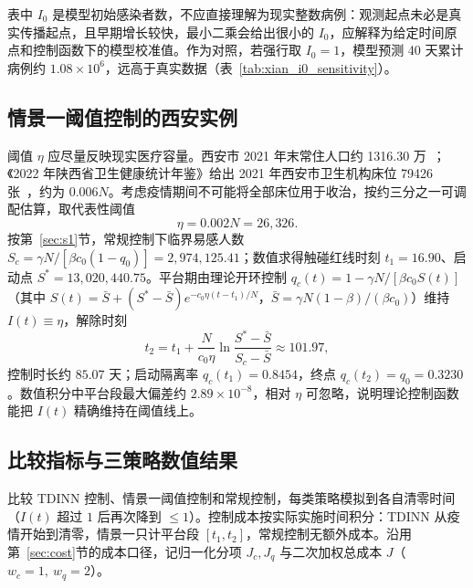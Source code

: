 \documentclass[lang=cn,a4paper,newtx]{elegantpaper}
\numberwithin{equation}{section}
\theoremstyle{plain}
\begin{document}
表中 $I_0$ 是模型初始感染者数，不应直接理解为现实整数病例：观测起点未必是真实传播起点，且早期增长较快，最小二乘会给出很小的 $I_0$，应解释为给定时间原点和控制函数下的模型校准值。作为对照，若强行取 $I_0=1$，模型预测 40 天累计病例约 $1.08\times10^6$，远高于真实数据（表~\ref{tab:xian_i0_sensitivity}）。

\begin{table}[htbp]
    \centering
    \caption{固定参数后的初始条件估计。}
    \label{tab:xian_initial_fit}
    
\end{table}

\begin{table}[htbp]
    \centering
    \caption{$I_0=1$ 对照设定下的初值敏感性说明。}
    \label{tab:xian_i0_sensitivity}
    {}
\end{table}

\subsection{情景一阈值控制的西安实例}
阈值 $\eta$ 应尽量反映现实医疗容量。西安市 2021 年末常住人口约 1316.30 万~\cite{XianStat2021}；《2022 年陕西省卫生健康统计年鉴》给出 2021 年西安市卫生机构床位 79426 张~\cite{ShaanxiHealth2022}，约为 $0.006N$。考虑疫情期间不可能将全部床位用于收治，按约三分之一可调配估算，取代表性阈值
\begin{equation}
\eta=0.002N=26{,}326.
\end{equation}
按第~\ref{sec:s1}节，常规控制下临界易感人数 $S_c=\gamma N/[\beta c_0(1-q_0)]=2{,}974{,}125.41$；数值求得触碰红线时刻 $t_1=16.90$、启动点 $S^*=13{,}020{,}440.75$。平台期由理论开环控制 $q_c(t)=1-\gamma N/[\beta c_0 S(t)]$（其中 $S(t)=\bar S+(S^*-\bar S)e^{-c_0\eta(t-t_1)/N}$，$\bar S=\gamma N(1-\beta)/(\beta c_0)$）维持 $I(t)\equiv\eta$，解除时刻
\[
t_2=t_1+\frac{N}{c_0\eta}\ln\frac{S^*-\bar S}{S_c-\bar S}\approx101.97,
\]
控制时长约 $85.07$ 天；启动隔离率 $q_c(t_1)=0.8454$，终点 $q_c(t_2)=q_0=0.3230$。数值积分中平台段最大偏差约 $2.89\times10^{-8}$，相对 $\eta$ 可忽略，说明理论控制函数能把 $I(t)$ 精确维持在阈值线上。

\subsection{比较指标与三策略数值结果}
比较 TDINN 控制、情景一阈值控制和常规控制，每类策略模拟到各自清零时间（$I(t)$ 超过 $1$ 后再次降到 $\le 1$）。控制成本按实际实施时间积分：TDINN 从疫情开始到清零，情景一只计平台段 $[t_1,t_2]$，常规控制无额外成本。沿用第~\ref{sec:cost}节的成本口径，记归一化分项 $J_c,J_q$ 与二次加权总成本 $J$（$w_c=1,\ w_q=2$）。
\end{document}
